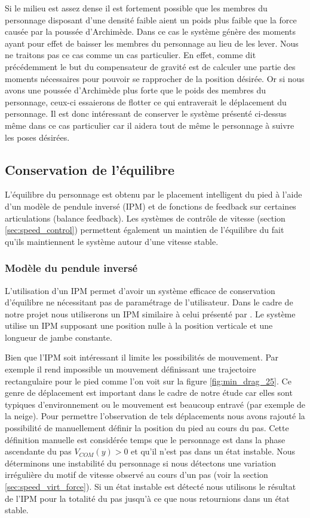 \documentclass[runningheads,a4paper]{llncs}
\begin{document}
Si le milieu est assez dense il est fortement possible que les membres du personnage disposant d'une densité faible aient un poids plus faible que la force causée par la poussée d'Archimède. Dans ce cas le système génère des moments ayant pour effet de baisser les membres du personnage au lieu de les lever. Nous ne traitons pas ce cas comme un cas particulier. En effet, comme dit précédemment le but du compensateur de gravité est de calculer une partie des moments nécessaires pour pouvoir se rapprocher de la position désirée. Or si nous avons une poussée d'Archimède plus forte que le poids des membres du personnage, ceux-ci essaierons de flotter ce qui entraverait le déplacement du personnage. Il est donc intéressant de conserver le système présenté ci-dessus même dans ce cas particulier car il aidera tout de même le personnage à suivre les poses désirées.
\subsection{Conservation de l'équilibre}
%
L'équilibre du personnage est obtenu par le placement intelligent du pied à l'aide d'un modèle de pendule inversé (IPM) et de fonctions de feedback sur certaines articulations (balance feedback). Les systèmes de contrôle de vitesse (section \ref{sec:speed_control}) permettent également un maintien de l'équilibre du fait qu'ils maintiennent le système autour d'une vitesse stable. 
%
\subsubsection{Modèle du pendule inversé}
%
\label{sec:IPM}
L'utilisation d'un IPM permet d'avoir un système efficace de conservation d'équilibre ne nécessitant pas de paramétrage de l'utilisateur. Dans le cadre de notre  projet nous utiliserons un IPM similaire à celui présenté par \cite{coros2010generalized}. Le système utilise un IPM supposant une position nulle à la position verticale et une longueur de jambe constante. 


Bien que l'IPM soit intéressant il limite les possibilités de mouvement. Par exemple il rend impossible un mouvement définissant une trajectoire rectangulaire pour le pied comme l'on voit sur la figure \ref{fig:min_drag_25}. Ce genre de déplacement est important dans le cadre de notre étude car elles sont typiques d'environnement ou le mouvement est beaucoup entravé (par exemple de la neige). Pour permettre l'observation de tels déplacements nous avons rajouté la possibilité de manuellement définir la position du pied au cours du pas. Cette définition manuelle est considérée temps que le personnage est dans la phase ascendante du pas \(V_{COM}(y)>0\) et qu'il n'est pas dans un état instable. Nous déterminons une instabilité du personnage si nous détectons une variation irrégulière du motif de vitesse observé au cours d'un pas (voir la section \ref{sec:speed_virt_force}). Si un état instable est détecté nous utilisons le résultat de l'IPM pour la totalité du pas jusqu'à ce que nous retournions dans un état stable.
%
\end{document}
